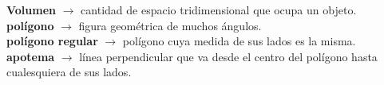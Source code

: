 \begin{defcard}
    \textbf{Volumen}	$\rightarrow$ cantidad de espacio tridimensional que ocupa un objeto.\\
    \textbf{polígono} $\rightarrow$ figura geométrica de muchos ángulos.\\
    \textbf{polígono regular} $\rightarrow$ polígono cuya medida de sus lados es la misma.\\
    \textbf{apotema} $\rightarrow$ línea perpendicular que va desde el centro del polígono hasta cualesquiera de sus lados.\\
\end{defcard}